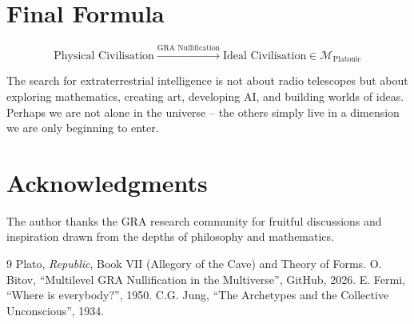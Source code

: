 \documentclass[12pt,a4paper]{article}
\begin{document}
\section*{Final Formula}

\[
\boxed{\text{Physical Civilisation} \xrightarrow{\text{GRA Nullification}} \text{Ideal Civilisation} \in \mathcal{M}_{\text{Platonic}}}
\]

The search for extraterrestrial intelligence is not about radio telescopes but about exploring mathematics, creating art, developing AI, and building worlds of ideas. Perhaps we are not alone in the universe – the others simply live in a dimension we are only beginning to enter.

\section*{Acknowledgments}

The author thanks the GRA research community for fruitful discussions and inspiration drawn from the depths of philosophy and mathematics.

\begin{thebibliography}{9}
 Plato, \textit{Republic}, Book VII (Allegory of the Cave) and Theory of Forms.
 O. Bitov, “Multilevel GRA Nullification in the Multiverse”, GitHub, 2026.
 E. Fermi, “Where is everybody?”, 1950.
 C.G. Jung, “The Archetypes and the Collective Unconscious”, 1934.
\end{thebibliography}
\end{document}
